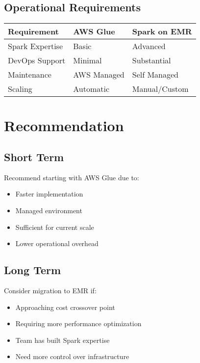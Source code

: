 \documentclass[
  letterpaper,
  DIV=11,
  numbers=noendperiod]{scrartcl}
\providecommand{\tightlist}{%
  \setlength{\itemsep}{0pt}\setlength{\parskip}{0pt}}\usepackage{longtable,booktabs,array}
\begin{document}
\subsection{Operational Requirements}\label{operational-requirements}

\begin{longtable}[]{@{}lll@{}}
\toprule\noalign{}
Requirement & AWS Glue & Spark on EMR \\
\midrule\noalign{}
\endhead
\bottomrule\noalign{}
\endlastfoot
Spark Expertise & Basic & Advanced \\
DevOps Support & Minimal & Substantial \\
Maintenance & AWS Managed & Self Managed \\
Scaling & Automatic & Manual/Custom \\
\end{longtable}

\section{Recommendation}\label{recommendation}

\subsection{Short Term}\label{short-term}

Recommend starting with AWS Glue due to:

\begin{itemize}
\tightlist
\item
  Faster implementation
\item
  Managed environment
\item
  Sufficient for current scale
\item
  Lower operational overhead
\end{itemize}

\subsection{Long Term}\label{long-term}

Consider migration to EMR if:

\begin{itemize}
\tightlist
\item
  Approaching cost crossover point
\item
  Requiring more performance optimization
\item
  Team has built Spark expertise
\item
  Need more control over infrastructure
\end{itemize}
\end{document}
